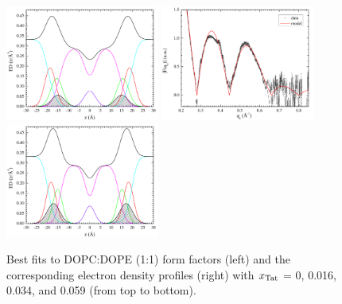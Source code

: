 \begin{figure}[htbp]
  \includegraphics[width=0.45\textwidth,valign=t]{./figures/Tat/SDP_Results/EDP/DOPCDOPE1to1_Tat_28to1_3p0_EDP1}
  \includegraphics[width=0.45\textwidth,valign=t]{figures/Tat/SDP_Results/XFF/DOPCDOPE1to1_Tat_16to1_3p0_XFF1}
  \includegraphics[width=0.45\textwidth,valign=t]{./figures/Tat/SDP_Results/EDP/DOPCDOPE1to1_Tat_16to1_3p0_EDP1}
  \caption{Best fits to DOPC:DOPE (1:1) form factors (left) and the corresponding 
  electron density profiles (right) with $x_\textrm{Tat}$ = 0, 0.016, 0.034, 
  and 0.059 (from top to bottom).}
  \label{fig:DOPCDOPE1to1_Tat_XFF1}
\end{figure}


